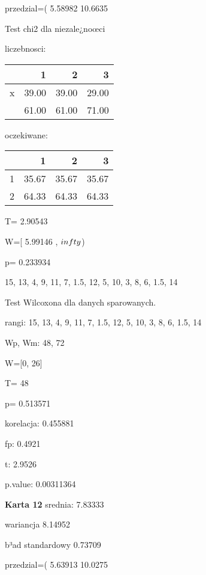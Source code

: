\documentclass[a4paper,12pt]{article}
\begin{document}
\begin{multicols}{3}
     przedzial=( 5.58982 10.6635 \vspace{1cm} 

  Test chi2 dla niezale¿noœci 
   
   liczebnosci: %
\begin{tabular}{rrrr}
  \hline
 & 1 & 2 & 3 \\
  \hline
x & 39.00 & 39.00 & 29.00 \\
   & 61.00 & 61.00 & 71.00 \\
   \hline
\end{tabular}
 
   
   oczekiwane: %
\begin{tabular}{rrrr}
  \hline
 & 1 & 2 & 3 \\
  \hline
1 & 35.67 & 35.67 & 35.67 \\
  2 & 64.33 & 64.33 & 64.33 \\
   \hline
\end{tabular}
 
   
   T= 2.90543 
   
   W=[ 5.99146 , $\\infty$) 
   
   p= 0.233934 \vspace{1cm} 

  15, 13, 4, 9, 11, 7, 1.5, 12, 5, 10, 3, 8, 6, 1.5, 14 

  Test Wilcoxona dla danych sparowanych. 
  
  rangi: 15, 13, 4, 9, 11, 7, 1.5, 12, 5, 10, 3, 8, 6, 1.5, 14 
  
  Wp, Wm:  48,  72 
  
  W=[0, 26]  
  
  T=  48 
  
  p= 0.513571 \vspace{1cm} 

  korelacja: 0.455881
     
     fp: 0.4921
     
     t: 2.9526
     
     p.value: 0.00311364 \vspace{1cm} 

  \textbf{Karta  12 } 
 srednia: 7.83333 
     
     wariancja 8.14952  
     
     b³ad standardowy 0.73709 
     
     przedzial=( 5.63913 10.0275 \vspace{1cm} 


\end{multicols}
\end{document}

